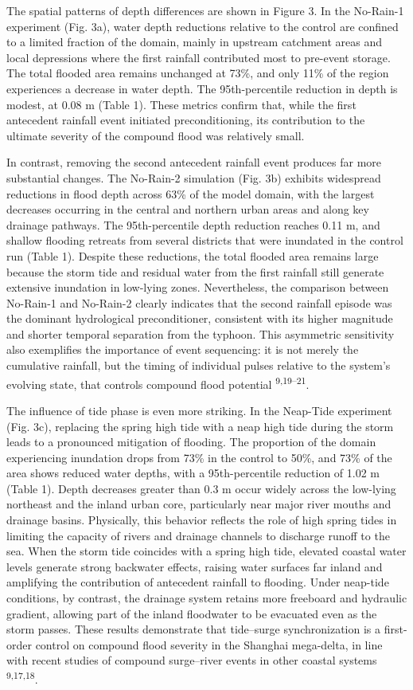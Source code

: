 \documentclass[
]{article}
\begin{document}
The spatial patterns of depth differences are shown in Figure 3. In the
No-Rain-1 experiment (Fig. 3a), water depth reductions relative to the
control are confined to a limited fraction of the domain, mainly in
upstream catchment areas and local depressions where the first rainfall
contributed most to pre-event storage. The total flooded area remains
unchanged at 73\%, and only 11\% of the region experiences a decrease in
water depth. The 95th-percentile reduction in depth is modest, at 0.08 m
(Table 1). These metrics confirm that, while the first antecedent
rainfall event initiated preconditioning, its contribution to the
ultimate severity of the compound flood was relatively small.

In contrast, removing the second antecedent rainfall event produces far
more substantial changes. The No-Rain-2 simulation (Fig. 3b) exhibits
widespread reductions in flood depth across 63\% of the model domain,
with the largest decreases occurring in the central and northern urban
areas and along key drainage pathways. The 95th-percentile depth
reduction reaches 0.11 m, and shallow flooding retreats from several
districts that were inundated in the control run (Table 1). Despite
these reductions, the total flooded area remains large because the storm
tide and residual water from the first rainfall still generate extensive
inundation in low-lying zones. Nevertheless, the comparison between
No-Rain-1 and No-Rain-2 clearly indicates that the second rainfall
episode was the dominant hydrological preconditioner, consistent with
its higher magnitude and shorter temporal separation from the typhoon.
This asymmetric sensitivity also exemplifies the importance of event
sequencing: it is not merely the cumulative rainfall, but the timing of
individual pulses relative to the system's evolving state, that controls
compound flood potential \textsuperscript{9,19--21}.

The influence of tide phase is even more striking. In the Neap-Tide
experiment (Fig. 3c), replacing the spring high tide with a neap high
tide during the storm leads to a pronounced mitigation of flooding. The
proportion of the domain experiencing inundation drops from 73\% in the
control to 50\%, and 73\% of the area shows reduced water depths, with a
95th-percentile reduction of 1.02 m (Table 1). Depth decreases greater
than 0.3 m occur widely across the low-lying northeast and the inland
urban core, particularly near major river mouths and drainage basins.
Physically, this behavior reflects the role of high spring tides in
limiting the capacity of rivers and drainage channels to discharge
runoff to the sea. When the storm tide coincides with a spring high
tide, elevated coastal water levels generate strong backwater effects,
raising water surfaces far inland and amplifying the contribution of
antecedent rainfall to flooding. Under neap-tide conditions, by
contrast, the drainage system retains more freeboard and hydraulic
gradient, allowing part of the inland floodwater to be evacuated even as
the storm passes. These results demonstrate that tide--surge
synchronization is a first-order control on compound flood severity in
the Shanghai mega-delta, in line with recent studies of compound
surge--river events in other coastal systems \textsuperscript{9,17,18}.
\end{document}
